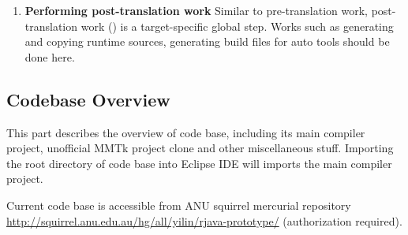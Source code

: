 \documentclass[12pt]{article}
\begin{document}
\begin{enumerate}
\begin{enumerate}
  \item
  \textbf{Performing post-translation work}
  Similar to pre-translation work, post-translation work 
  () is a target-specific global step. 
  Works such as generating and copying runtime sources, generating build files for
  auto tools should be done here. 
  \end{enumerate}

\end{enumerate}

\subsection{Codebase Overview}

This part describes the overview of \rjcfull code base, 
including its main compiler project, unofficial MMTk project clone
and other miscellaneous stuff. Importing the root directory of \rjc 
code base into Eclipse IDE 
will imports the main compiler project. 

Current code base is accessible from ANU squirrel mercurial repository
\url{http://squirrel.anu.edu.au/hg/all/yilin/rjava-prototype/} 
(authorization required). 
\end{document}
